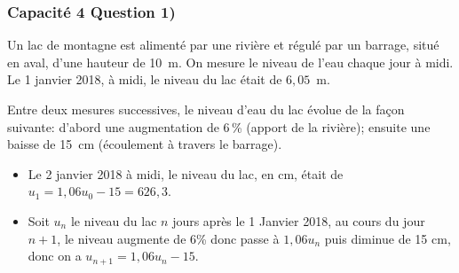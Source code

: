 \documentclass[11pt, hyperref={urlcolor=red,%
            linkcolor=blue, %
            colorlinks=true}]{beamer}
\begin{document}
\begin{frame}
\frametitle{Capacité 4 Question 1)}

Un lac de montagne est alimenté par une rivière et régulé par un barrage, situé en aval, d'une hauteur de 10~m. On mesure le niveau de l'eau chaque jour à midi. Le 1\ier{} janvier 2018, à midi, le niveau du lac était de $6,05$~m.

\smallskip

Entre deux mesures successives, le niveau d'eau du lac évolue de la façon suivante:
d'abord une augmentation de 6\,\% (apport de la rivière); ensuite une baisse de 15~cm (écoulement à travers le barrage).

\begin{itemize}
\pause \item Le 2 janvier 2018 à midi, le  niveau du lac, en cm, était de 
$u_{1}=1,06u_{0} - 15=626,3$.
\pause \item Soit $u_{n}$ le niveau du lac  $n$ jours après le 1 Janvier 2018, au cours du jour $n+1$, le niveau augmente de $6$\% donc passe à $1,06u_{n}$ puis diminue de 15 cm, donc on a $u_{n+1}=1,06u_{n}-15$.


\end{itemize}

\end{frame}
\end{document}

